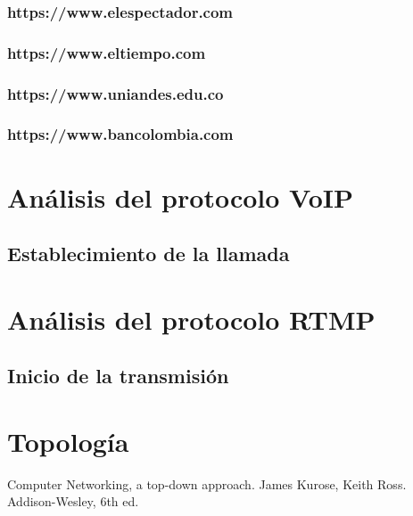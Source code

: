 \documentclass[10pt]{article}
\begin{document}
\subsubsection{https://www.elespectador.com}
\subsubsection{https://www.eltiempo.com}
\subsubsection{https://www.uniandes.edu.co}
\subsubsection{https://www.bancolombia.com}


\renewcommand{\thesection}{8.\arabic{section}}
\section{Análisis del protocolo VoIP}
\subsection{Establecimiento de la llamada}


\renewcommand{\thesection}{8.\arabic{section}}
\section{Análisis del protocolo RTMP}
\subsection{Inicio de la transmisión}


\renewcommand{\thesection}{9.\arabic{section}}
\setcounter{section}{0}
\section{Topología}












\begin{thebibliography}{9}


  Computer Networking, a top-down approach. James Kurose, Keith Ross. Addison-Wesley, 6th ed.

  \end{thebibliography}
\end{document}
